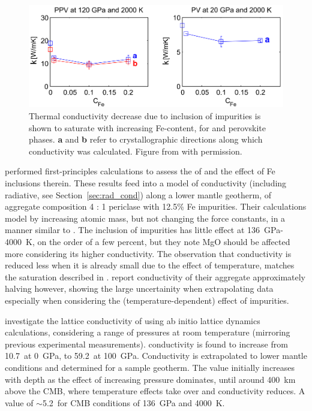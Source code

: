\begin{figure}[h!]
  \includegraphics[width=\linewidth]{Figures/ammann_saturation.png}
  \caption[Thermal conductivity against Fe-content]{Thermal conductivity decrease due to inclusion of impurities is shown to saturate with increasing Fe-content, for \mgsios \ppv and perovskite phases. \textbf{a} and \textbf{b} refer to crystallographic directions along which conductivity was calculated. Figure from \citet{Ammann2014} with permission.}
  \label{fig:ammann_sat}
\end{figure}

\citet{Tang2014} performed first-principles calculations to assess the \tcs of \mgsios and the effect of Fe inclusions therein. These results feed into a model of conductivity (including radiative, see Section~\ref{sec:rad_cond}) along a lower mantle geotherm, of aggregate composition 4 \bdg : 1 periclase with 12.5\% Fe impurities. Their calculations model \mgfesios by increasing atomic mass, but not changing the force constants, in a manner similar to \citet{Ammann2014}. The inclusion of impurities has little effect at 136~GPa-4000~K, on the order of a few percent, but they note MgO should be affected more considering its higher conductivity. The observation that conductivity is reduced less when it is already small due to the effect of temperature, matches the saturation described in \citet{Ammann2014}. \citet{Haigis2012} report conductivity of their aggregate approximately halving however, showing the large uncertainity when extrapolating data especially when considering the (temperature-dependent) effect of impurities.



\citet{Ghaderi2017} investigate the lattice conductivity of \bdgs using ab initio lattice dynamics calculations, considering a range of pressures at room temperature (mirroring previous experimental measurements). \mgsios conductivity is found to increase from 10.7~\wmk at 0~GPa, to 59.2~\wmk at 100~GPa. Conductivity is extrapolated to lower mantle conditions and determined for a sample geotherm. The value initially increases with depth as the effect of increasing pressure dominates, until around 400~km above the CMB, where temperature effects take over and conductivity reduces. A value of $\sim$5.2~\wmk for CMB conditions of 136~GPa and 4000~K. 


